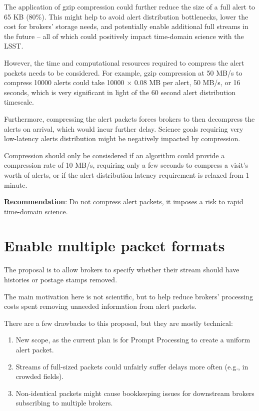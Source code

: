 \documentclass[DM,authoryear,toc]{lsstdoc}
\begin{document}
The application of gzip compression could further reduce the size of a full alert to 65 KB (80\%).
This might help to avoid alert distribution bottlenecks, lower the cost for brokers' storage needs, and potentially enable additional full streams in the future -- all of which could positively impact time-domain science with the LSST.

However, the time and computational resources required to compress the alert packets needs to be considered.
For example, gzip compression at 50 MB/s to compress 10000 alerts could take 10000 $\times$ 0.08 MB per alert, 50 MB/s, or 16 seconds, which is very significant in light of the 60 second alert distribution timescale. 

Furthermore, compressing the alert packets forces brokers to then decompress the alerts on arrival, which would incur further delay.
Science goals requiring very low-latency alerts distribution might be negatively impacted by compression.

Compression should only be consisdered if an algorithm could provide a compression rate of 10 MB/s, requiring only a few seconds to compress a visit's worth of alerts, or if the alert distribution latency requirement is relaxed from 1 minute.

\textbf{Recommendation}: Do not compress alert packets, it imposes a risk to rapid time-domain science.


\section{Enable multiple packet formats}\label{sec:multiformats}

The proposal is to allow brokers to specify whether their stream should have histories or postage stamps removed.

The main motivation here is not scientific, but to help reduce brokers' processing costs spent removing unneeded information from alert packets. 

There are a few drawbacks to this proposal, but they are mostly technical:

\begin{enumerate}
\item New scope, as the current plan is for Prompt Processing to create a uniform alert packet.
\item Streams of full-sized packets could unfairly suffer delays more often (e.g., in crowded fields).
\item Non-identical packets might cause bookkeeping issues for downstream brokers subscribing to multiple brokers.
\end{enumerate}
\end{document}
